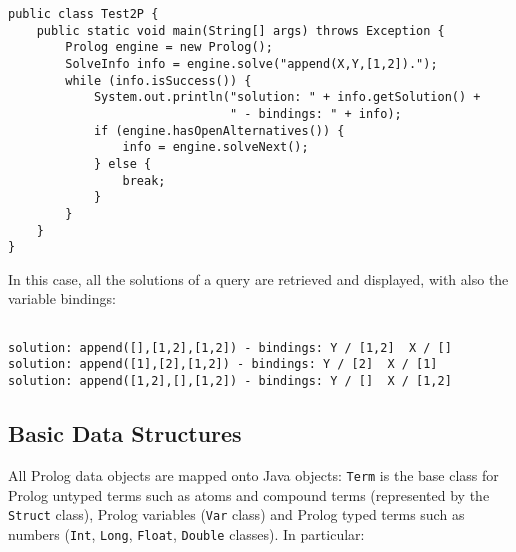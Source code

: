 {\small{
\begin{verbatim}
public class Test2P {
    public static void main(String[] args) throws Exception {
        Prolog engine = new Prolog();
        SolveInfo info = engine.solve("append(X,Y,[1,2]).");
        while (info.isSuccess()) {
            System.out.println("solution: " + info.getSolution() +
                               " - bindings: " + info);
            if (engine.hasOpenAlternatives()) {
                info = engine.solveNext();
            } else {
                break;
            }
        }
    }
}
\end{verbatim}
}}

In this case, all the solutions of a query are retrieved and
displayed, with also the variable bindings:
{\small{\begin{verbatim}

solution: append([],[1,2],[1,2]) - bindings: Y / [1,2]  X / []
solution: append([1],[2],[1,2]) - bindings: Y / [2]  X / [1]
solution: append([1,2],[],[1,2]) - bindings: Y / []  X / [1,2]

\end{verbatim}
}}

\subsection{Basic Data Structures}
\label{ssec:java-api-types}

\noindent All Prolog data objects are mapped onto Java objects:
\texttt{Term} is the base class for Prolog untyped terms such as
atoms and compound terms (represented by the \texttt{Struct} class),
Prolog variables (\texttt{Var} class) and Prolog typed terms such
as numbers (\texttt{Int}, \texttt{Long}, \texttt{Float},
\texttt{Double} classes).
%
In particular:

